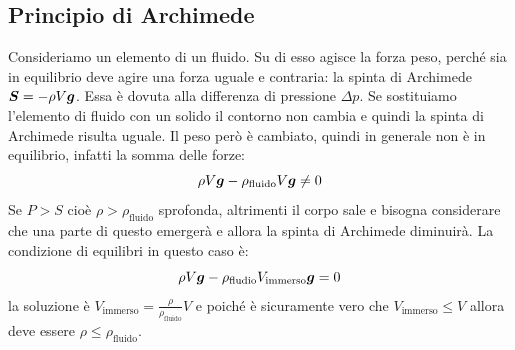 \subsection{Principio di Archimede}
Consideriamo un elemento di un fluido. Su di esso agisce la forza peso, perché sia in equilibrio deve agire una forza uguale e contraria: la spinta di Archimede $\boldsymbol{S}=-\rho V\boldsymbol{g}$. Essa è dovuta alla differenza di pressione $\Delta p$. Se sostituiamo l'elemento di fluido con un solido il contorno non cambia e quindi la spinta di Archimede risulta uguale. Il peso però è cambiato, quindi in generale non è in equilibrio, infatti la somma delle forze:
\[
   \rho V\boldsymbol{g} - \rho_\text{fluido}V\boldsymbol{g} \neq 0
\]
Se $P>S$ cioè $\rho>\rho_\text{fluido}$ sprofonda, altrimenti il corpo sale e bisogna considerare che una parte di questo emergerà e allora la spinta di Archimede diminuirà. La condizione di equilibri in questo caso è:
\[
   \rho V\boldsymbol{g} - \rho_\text{fludio}V_\text{immerso}\boldsymbol{g} = 0
\]
la soluzione è $V_\text{immerso}=\frac{\rho}{\rho_\text{fluido}}V$ e poiché è sicuramente vero che $V_\text{immerso}\leq V$ allora deve essere $\rho\leq\rho_\text{fluido}$.



